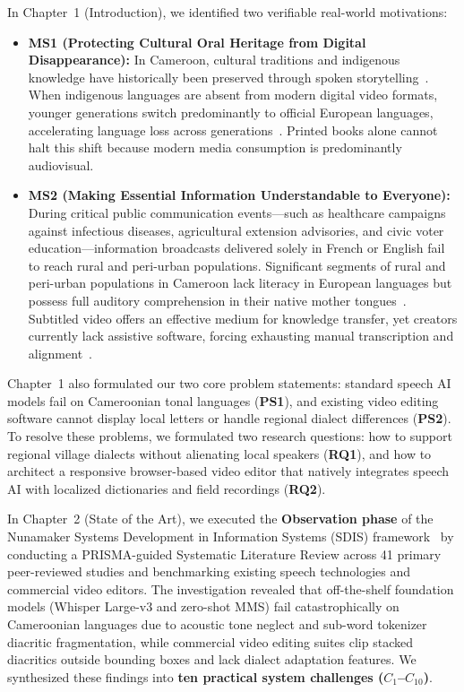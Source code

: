 \documentclass[a4paper,11pt]{article}
\begin{document}
In Chapter~1 (Introduction), we identified two verifiable real-world motivations:
\begin{itemize}
    \item \textbf{MS1 (Protecting Cultural Oral Heritage from Digital Disappearance):} In Cameroon, cultural traditions and indigenous knowledge have historically been preserved through spoken storytelling~\cite{carroll2020care}. When indigenous languages are absent from modern digital video formats, younger generations switch predominantly to official European languages, accelerating language loss across generations~\cite{carroll2020care, nekoto2020participatory}. Printed books alone cannot halt this shift because modern media consumption is predominantly audiovisual.
    \item \textbf{MS2 (Making Essential Information Understandable to Everyone):} During critical public communication events---such as healthcare campaigns against infectious diseases, agricultural extension advisories, and civic voter education---information broadcasts delivered solely in French or English fail to reach rural and peri-urban populations. Significant segments of rural and peri-urban populations in Cameroon lack literacy in European languages but possess full auditory comprehension in their native mother tongues~\cite{norman1986user, w3c2019webvtt}. Subtitled video offers an effective medium for knowledge transfer, yet creators currently lack assistive software, forcing exhausting manual transcription and alignment~\cite{w3c2019webvtt}.
\end{itemize}

Chapter~1 also formulated our two core problem statements: standard speech AI models fail on Cameroonian tonal languages (\textbf{PS1}), and existing video editing software cannot display local letters or handle regional dialect differences (\textbf{PS2}). To resolve these problems, we formulated two research questions: how to support regional village dialects without alienating local speakers (\textbf{RQ1}), and how to architect a responsive browser-based video editor that natively integrates speech AI with localized dictionaries and field recordings (\textbf{RQ2}).

In Chapter~2 (State of the Art), we executed the \textbf{Observation phase} of the Nunamaker Systems Development in Information Systems (SDIS) framework~\cite{nunamaker1990systems} by conducting a PRISMA-guided Systematic Literature Review across 41 primary peer-reviewed studies and benchmarking existing speech technologies and commercial video editors. The investigation revealed that off-the-shelf foundation models (Whisper Large-v3 and zero-shot MMS) fail catastrophically on Cameroonian languages due to acoustic tone neglect and sub-word tokenizer diacritic fragmentation, while commercial video editing suites clip stacked diacritics outside bounding boxes and lack dialect adaptation features. We synthesized these findings into \textbf{ten practical system challenges ($C_1$--$C_{10}$)}.
\end{document}
